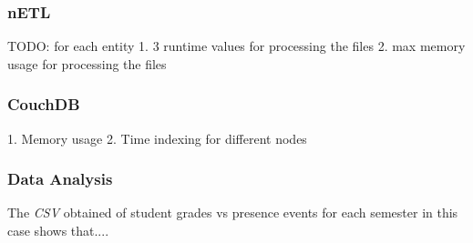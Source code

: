 \subsubsection*{nETL}
TODO: for each entity
1. 3 runtime values for processing the files
2. max memory usage for processing the files

\subsubsection*{CouchDB}
1. Memory usage
2. Time indexing for different nodes


\subsubsection*{Data Analysis}
The \textit{CSV} obtained of student grades vs presence events for each semester in this case shows that....